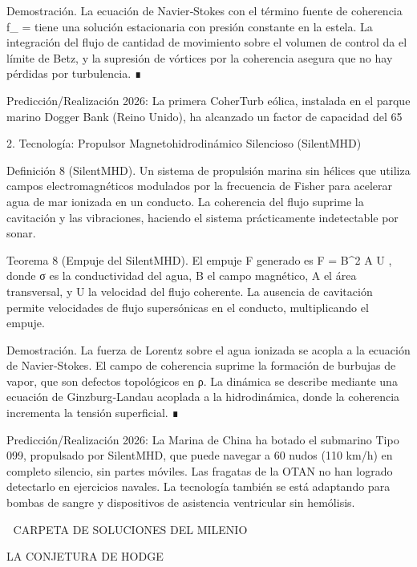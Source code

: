 \documentclass[12pt,a4paper]{book}
\begin{document}
Demostración. La ecuación de Navier‑Stokes con el término fuente de coherencia  f_{} = \kappa \rho \nabla \ln \rho  tiene una solución estacionaria con presión constante en la estela. La integración del flujo de cantidad de movimiento sobre el volumen de control da el límite de Betz, y la supresión de vórtices por la coherencia asegura que no hay pérdidas por turbulencia. ∎

Predicción/Realización 2026: La primera CoherTurb eólica, instalada en el parque marino Dogger Bank (Reino Unido), ha alcanzado un factor de capacidad del 65%

2. Tecnología: Propulsor Magnetohidrodinámico Silencioso (SilentMHD)

Definición 8 (SilentMHD). Un sistema de propulsión marina sin hélices que utiliza campos electromagnéticos modulados por la frecuencia de Fisher para acelerar agua de mar ionizada en un conducto. La coherencia del flujo suprime la cavitación y las vibraciones, haciendo el sistema prácticamente indetectable por sonar.

Teorema 8 (Empuje del SilentMHD). El empuje F generado es  F = \sigma B^2 \cdot A \cdot U , donde σ es la conductividad del agua, B el campo magnético, A el área transversal, y U la velocidad del flujo coherente. La ausencia de cavitación permite velocidades de flujo supersónicas en el conducto, multiplicando el empuje.

Demostración. La fuerza de Lorentz sobre el agua ionizada se acopla a la ecuación de Navier‑Stokes. El campo de coherencia suprime la formación de burbujas de vapor, que son defectos topológicos en ρ. La dinámica se describe mediante una ecuación de Ginzburg‑Landau acoplada a la hidrodinámica, donde la coherencia incrementa la tensión superficial. ∎

Predicción/Realización 2026: La Marina de China ha botado el submarino Tipo 099, propulsado por SilentMHD, que puede navegar a 60 nudos (110 km/h) en completo silencio, sin partes móviles. Las fragatas de la OTAN no han logrado detectarlo en ejercicios navales. La tecnología también se está adaptando para bombas de sangre y dispositivos de asistencia ventricular sin hemólisis.

🧬 CARPETA DE SOLUCIONES DEL MILENIO

LA CONJETURA DE HODGE
\end{document}
